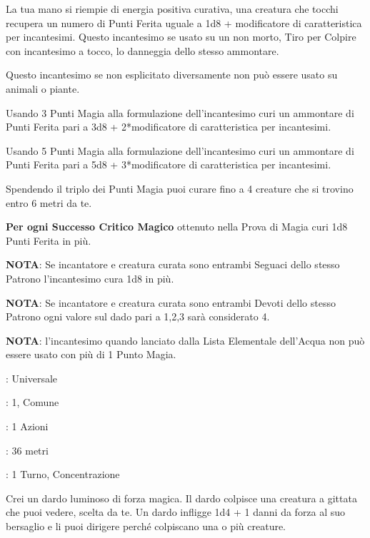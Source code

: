 \begin{multicols}{2}
La tua mano si riempie di energia positiva curativa, una creatura che tocchi recupera un numero di Punti Ferita uguale a 1d8 + modificatore di caratteristica per incantesimi. Questo incantesimo se usato su un non morto, Tiro per Colpire con incantesimo a tocco, lo danneggia dello stesso ammontare.

Questo incantesimo se non esplicitato diversamente non può essere usato su animali o piante.

Usando 3 Punti Magia alla formulazione dell'incantesimo curi un ammontare di Punti Ferita pari a 3d8 + 2*modificatore di caratteristica per incantesimi.

Usando 5 Punti Magia alla formulazione dell'incantesimo curi un ammontare di Punti Ferita pari a 5d8 + 3*modificatore di caratteristica per incantesimi.

Spendendo il triplo dei Punti Magia puoi curare fino a 4 creature che si trovino entro 6 metri da te.

\textbf{Per ogni Successo Critico Magico} ottenuto nella Prova di Magia curi 1d8 Punti Ferita in più.

\textbf{NOTA}: Se incantatore e creatura curata sono entrambi Seguaci dello stesso Patrono l'incantesimo cura 1d8 in più.

\textbf{NOTA}: Se incantatore e creatura curata sono entrambi Devoti dello stesso Patrono ogni valore sul dado pari a 1,2,3 sarà considerato 4.

\textbf{NOTA}: l'incantesimo quando lanciato dalla Lista Elementale dell'Acqua non può essere usato con più di 1 Punto Magia.

\noindent\colorbox{OBSSgold!10}{
\begin{minipage}{0.95\linewidth}
\begin{description}[noitemsep, topsep=0pt, parsep=0pt, partopsep=0pt, leftmargin=0cm, labelwidth=1.3cm]
	\item[\textbf{Lista}]: Universale
	\item[\textbf{Livello}]: 1, Comune
	\item[\textbf{Lancio}]: 1 Azioni
	\item[\textbf{Gittata}]: 36 metri
	\item[\textbf{Durata}]: 1 Turno, Concentrazione
\end{description}
\end{minipage}}\smallskip

Crei un dardo luminoso di forza magica. Il dardo colpisce una creatura a gittata che puoi vedere, scelta da te. Un dardo infligge 1d4 + 1 danni da forza al suo bersaglio e li puoi dirigere perché colpiscano una o più creature.


\end{multicols}
